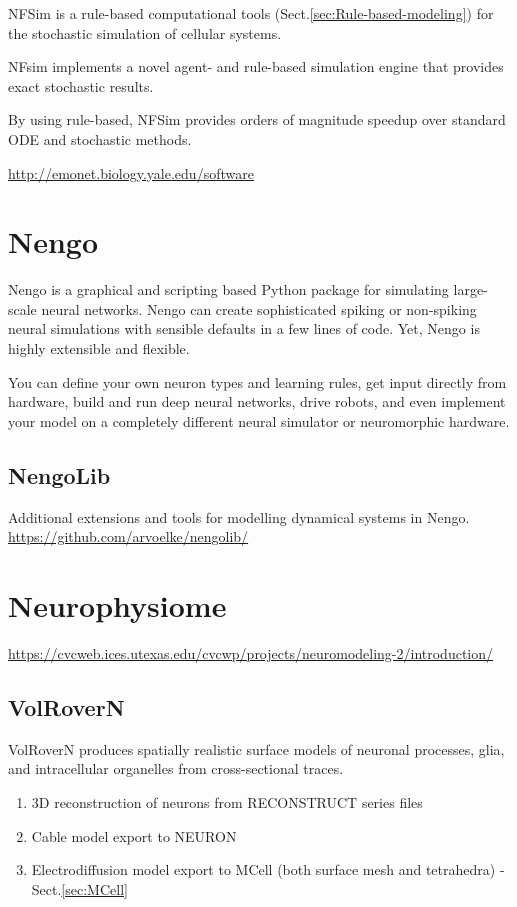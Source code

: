 NFSim is a rule-based computational tools
(Sect.\ref{sec:Rule-based-modeling}) for the stochastic simulation of cellular
systems.

NFsim implements a novel agent- and rule-based simulation engine that provides
exact stochastic results. 

By using rule-based, NFSim provides orders of magnitude speedup over standard
ODE and stochastic methods.

\url{http://emonet.biology.yale.edu/software}

\section{Nengo}
\label{sec:Nengo}

Nengo is a graphical and scripting based Python package for simulating
large-scale neural networks. Nengo can create sophisticated spiking or
non-spiking neural simulations with sensible defaults in a few lines of code.
Yet, Nengo is highly extensible and flexible.

 You can define your own neuron types and learning rules, get input directly
from hardware, build and run deep neural networks, drive robots, and even
implement your model on a completely different neural simulator or neuromorphic
hardware.

\subsection{NengoLib}


Additional extensions and tools for modelling dynamical systems in Nengo.
\url{https://github.com/arvoelke/nengolib/}

\section{Neurophysiome}
\label{sec:Neurophysiome}

\url{https://cvcweb.ices.utexas.edu/cvcwp/projects/neuromodeling-2/introduction/}

\subsection{VolRoverN}
\label{sec:VolRoverN}

VolRoverN produces spatially realistic surface models of neuronal processes,
glia, and intracellular organelles from cross-sectional traces.
\begin{enumerate}
  \item  3D reconstruction of neurons from RECONSTRUCT series files
  
  \item  Cable model export to NEURON
  
  \item Electrodiffusion model export to MCell (both surface mesh and
  tetrahedra) - Sect.\ref{sec:MCell}
\end{enumerate}

